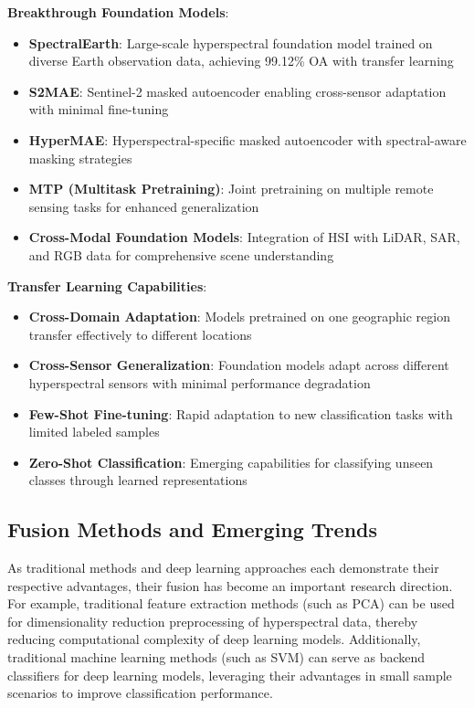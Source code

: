 \documentclass[journal]{IEEEtran}
\begin{document}
\textbf{Breakthrough Foundation Models}:
\begin{itemize}
\item \textbf{SpectralEarth}: Large-scale hyperspectral foundation model trained on diverse Earth observation data, achieving 99.12\% OA with transfer learning
\item \textbf{S2MAE}: Sentinel-2 masked autoencoder enabling cross-sensor adaptation with minimal fine-tuning
\item \textbf{HyperMAE}: Hyperspectral-specific masked autoencoder with spectral-aware masking strategies
\item \textbf{MTP (Multitask Pretraining)}: Joint pretraining on multiple remote sensing tasks for enhanced generalization
\item \textbf{Cross-Modal Foundation Models}: Integration of HSI with LiDAR, SAR, and RGB data for comprehensive scene understanding
\end{itemize}

\textbf{Transfer Learning Capabilities}:
\begin{itemize}
\item \textbf{Cross-Domain Adaptation}: Models pretrained on one geographic region transfer effectively to different locations
\item \textbf{Cross-Sensor Generalization}: Foundation models adapt across different hyperspectral sensors with minimal performance degradation
\item \textbf{Few-Shot Fine-tuning}: Rapid adaptation to new classification tasks with limited labeled samples
\item \textbf{Zero-Shot Classification}: Emerging capabilities for classifying unseen classes through learned representations
\end{itemize}

\subsection{Fusion Methods and Emerging Trends}

As traditional methods and deep learning approaches each demonstrate their respective advantages, their fusion has become an important research direction. For example, traditional feature extraction methods (such as PCA) can be used for dimensionality reduction preprocessing of hyperspectral data, thereby reducing computational complexity of deep learning models. Additionally, traditional machine learning methods (such as SVM) can serve as backend classifiers for deep learning models, leveraging their advantages in small sample scenarios to improve classification performance.
\end{document}

